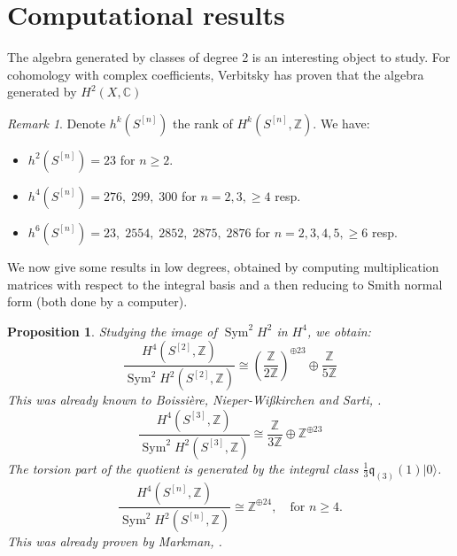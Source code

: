 \documentclass{amsart}
\DeclareMathOperator{\Sym}{Sym}
\newcommand{\hilb}[1]{^{[#1]}}
\newcommand{\vac}{|0\rangle}
\newcommand{\IC}{\mathbb{C}}
\newcommand{\IZ}{\mathbb{Z}}
\newcommand{\kq}{\mathfrak{q}}
\theoremstyle{plain}
\newtheorem{proposition}[theorem]{Proposition}
\theoremstyle{definition}
\theoremstyle{remark}
\newtheorem{remark}[theorem]{Remark}
\begin{document}
\section{Computational results} 
The algebra generated by classes of degree 2 is an interesting object to study. For cohomology with complex coefficients, Verbitsky has proven that the algebra generated by $H^2(X,\IC)$
\begin{remark}
Denote $h^k(S\hilb{n})$ the rank of $H^k(S\hilb{n},\IZ)$. We have:
\begin{itemize}
\item $h^2(S\hilb{n}) = 23 $ for $n\geq 2$.
\item $h^4(S\hilb{n}) = 276,\; 299,\; 300$ for $n=2,3, \geq 4$ resp.
\item $h^6(S\hilb{n}) = 23,\; 2554,\; 2852,\; 2875,\; 2876$ for $n=2,3,4,5,\geq6$ resp.
\end{itemize}
\end{remark}
We now give some results in low degrees, obtained by computing multiplication matrices with respect to the integral basis and a then reducing to Smith normal form (both done by a computer).
\begin{proposition} Studying the image of $\Sym^2H^2$ in $H^4$, we obtain: 
$$
\frac{H^4(S\hilb{2},\IZ)}{\Sym^2 H^2(S\hilb{2},\IZ)}  \cong \left(\frac{\IZ}{2\IZ}\right)^{\oplus 23} \oplus \frac{\IZ}{5\IZ}
$$
This was already known to Boissi\`{e}re, Nieper-Wi\ss kirchen and Sarti, \cite[Prop. 3]{BNS}.
$$
\frac{H^4(S\hilb{3},\IZ)}{\Sym^2 H^2(S\hilb{3},\IZ)} \cong \frac{\IZ}{3\IZ} \oplus \IZ^ {\oplus 23} 
$$
The torsion part of the quotient is generated by the integral class $\frac{1}{3}\kq_{(3)}(1)\vac$.
$$
\frac{H^4(S\hilb{n},\IZ)}{\Sym^2 H^2(S\hilb{n},\IZ)} \cong  \IZ^ {\oplus 24}, \quad \text{for }n\geq 4.
$$
This was already proven by Markman, \cite[Thm. 1.10]{Markman2}.
\end{proposition}
\end{document}
